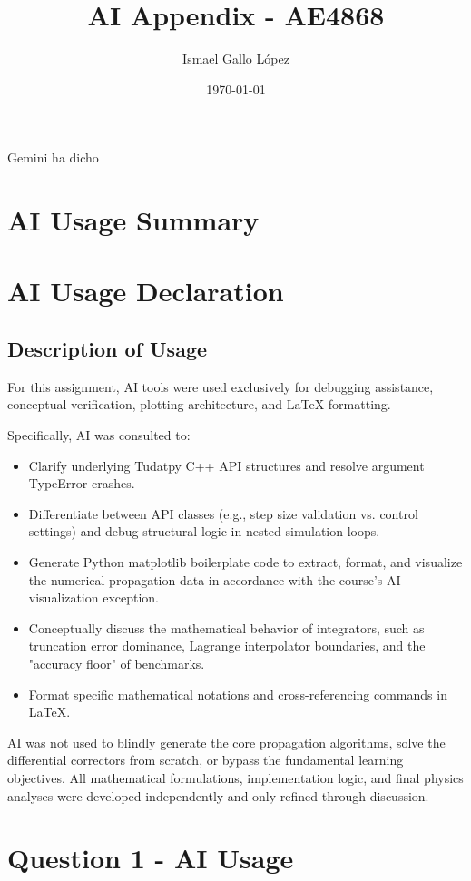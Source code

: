 \documentclass[a4paper,12pt]{article}
\title{AI Appendix - AE4868}
\author{Ismael Gallo López} %
\date{\today}
\begin{document}
\maketitle

Gemini ha dicho
\section*{AI Usage Summary}

\section*{AI Usage Declaration}

\subsection*{Description of Usage}

For this assignment, AI tools were used exclusively for debugging assistance, conceptual verification, plotting architecture, and LaTeX formatting.

Specifically, AI was consulted to:

\begin{itemize}
\item Clarify underlying Tudatpy C++ API structures and resolve argument TypeError crashes.
\item Differentiate between API classes (e.g., step size validation vs. control settings) and debug structural logic in nested simulation loops.
\item Generate Python matplotlib boilerplate code to extract, format, and visualize the numerical propagation data in accordance with the course's AI visualization exception.
\item Conceptually discuss the mathematical behavior of integrators, such as truncation error dominance, Lagrange interpolator boundaries, and the "accuracy floor" of benchmarks.
\item Format specific mathematical notations and cross-referencing commands in LaTeX.
\end{itemize}

AI was not used to blindly generate the core propagation algorithms, solve the differential correctors from scratch, or bypass the fundamental learning objectives. All mathematical formulations, implementation logic, and final physics analyses were developed independently and only refined through discussion.

\section*{Question 1 - AI Usage}
\end{document}
